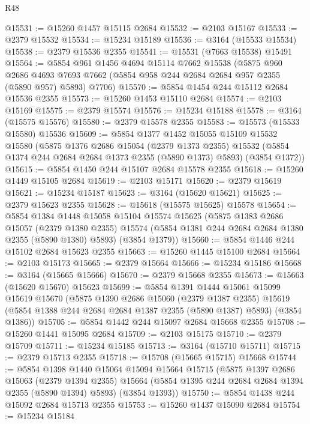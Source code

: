 \begin{lexlean}{R48}
\begin{coremodule}
@15531 := @15260 @1457 @15115 @2684
@15532 := @2103 @15167
@15533 := @2379 @15532
@15534 := @15234 @15189
@15536 := @3164 (@15533 @15534)
@15538 := @2379 @15536 @2355
@15541 := @15531 (@7663 @15538) @15491
@15564 := @5854
    @961
    @1456
    @4694
    @15114
    @7662
    @15538
    (@5875
      @960
      @2686
      @4693
      @7693
      @7662
      (@5854 @958 @244 @2684 @2684 @957 @2355 (@5890 @957) @5893)
      @7706)
@15570 := @5854 @1454 @244 @15112 @2684 @15536 @2355
@15573 := @15260 @1453 @15110 @2684
@15574 := @2103 @15169
@15575 := @2379 @15574
@15576 := @15234 @15188
@15578 := @3164 (@15575 @15576)
@15580 := @2379 @15578 @2355
@15583 := @15573 (@15533 @15580) @15536
@15609 := @5854
    @1377
    @1452
    @15055
    @15109
    @15532
    @15580
    (@5875
      @1376
      @2686
      @15054
      (@2379 @1373 @2355)
      @15532
      (@5854 @1374 @244 @2684 @2684 @1373 @2355 (@5890 @1373) @5893)
      (@3854 @1372))
@15615 := @5854 @1450 @244 @15107 @2684 @15578 @2355
@15618 := @15260 @1449 @15105 @2684
@15619 := @2103 @15171
@15620 := @2379 @15619
@15621 := @15234 @15187
@15623 := @3164 (@15620 @15621)
@15625 := @2379 @15623 @2355
@15628 := @15618 (@15575 @15625) @15578
@15654 := @5854
    @1384
    @1448
    @15058
    @15104
    @15574
    @15625
    (@5875
      @1383
      @2686
      @15057
      (@2379 @1380 @2355)
      @15574
      (@5854 @1381 @244 @2684 @2684 @1380 @2355 (@5890 @1380) @5893)
      (@3854 @1379))
@15660 := @5854 @1446 @244 @15102 @2684 @15623 @2355
@15663 := @15260 @1445 @15100 @2684
@15664 := @2103 @15173
@15665 := @2379 @15664
@15666 := @15234 @15186
@15668 := @3164 (@15665 @15666)
@15670 := @2379 @15668 @2355
@15673 := @15663 (@15620 @15670) @15623
@15699 := @5854
    @1391
    @1444
    @15061
    @15099
    @15619
    @15670
    (@5875
      @1390
      @2686
      @15060
      (@2379 @1387 @2355)
      @15619
      (@5854 @1388 @244 @2684 @2684 @1387 @2355 (@5890 @1387) @5893)
      (@3854 @1386))
@15705 := @5854 @1442 @244 @15097 @2684 @15668 @2355
@15708 := @15260 @1441 @15095 @2684
@15709 := @2103 @15175
@15710 := @2379 @15709
@15711 := @15234 @15185
@15713 := @3164 (@15710 @15711)
@15715 := @2379 @15713 @2355
@15718 := @15708 (@15665 @15715) @15668
@15744 := @5854
    @1398
    @1440
    @15064
    @15094
    @15664
    @15715
    (@5875
      @1397
      @2686
      @15063
      (@2379 @1394 @2355)
      @15664
      (@5854 @1395 @244 @2684 @2684 @1394 @2355 (@5890 @1394) @5893)
      (@3854 @1393))
@15750 := @5854 @1438 @244 @15092 @2684 @15713 @2355
@15753 := @15260 @1437 @15090 @2684
@15754 := @15234 @15184

\end{coremodule}
\end{lexlean}
